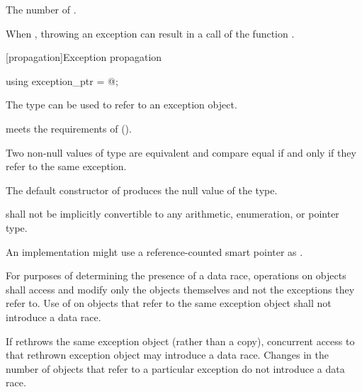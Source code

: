 \begin{itemdescr}
\pnum
\returns
The number of .

\pnum
\remarks
When ,
throwing an exception can result in a call of the function
.
\end{itemdescr}

[propagation]{Exception propagation}

\begin{indexed}{}
\begin{itemdecl}
using exception_ptr = @\unspec@;
\end{itemdecl}
\end{indexed}

\begin{itemdescr}
\pnum
The type  can be used to refer to an exception object.

\pnum
{} meets the requirements of
 ().

\pnum
Two non-null values of type  are equivalent and compare equal if and
only if they refer to the same exception.

\pnum
The default constructor of  produces the null value of the
type.

\pnum
{} shall not be implicitly convertible to any arithmetic,
enumeration, or pointer type.

\pnum
\begin{note}
An implementation might use a reference-counted smart
pointer as .
\end{note}

\pnum
For purposes of determining the presence of a data race, operations on
 objects shall access and modify only the
 objects themselves and not the exceptions they refer to.
Use of  on  objects that refer to
the same exception object shall not introduce a data race.
\begin{note}
If
 rethrows the same exception object (rather than a copy),
concurrent access to that rethrown exception object may introduce a data race.
Changes in the number of  objects that refer to a
particular exception do not introduce a data race.
\end{note}
\end{itemdescr}


